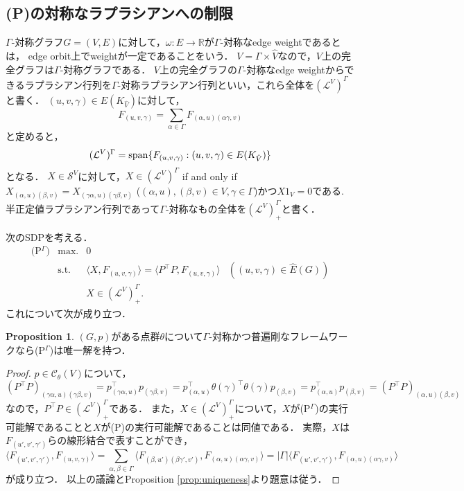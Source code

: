 \documentclass[11pt]{article}
\theoremstyle{definition}
\newtheorem{prop}[defi]{Proposition}
\begin{document}
\subsection{(P)の対称なラプラシアンへの制限}
    $\Gamma$-対称グラフ$G=(V,E)$に対して，$\omega:E \rightarrow \mathbb{R}$が$\Gamma$-対称なedge weightであるとは，
    edge orbit上でweightが一定であることをいう．
    $V=\Gamma \times \hat{V}$なので，$V$上の完全グラフは$\Gamma$-対称グラフである．
    $V$上の完全グラフの$\Gamma$-対称なedge weightからできるラプラシアン行列を$\Gamma$-対称ラプラシアン行列といい，これら全体を$(\mathcal{L}^V)^\Gamma$と書く．
    $(u,v,\gamma) \in E(K_{\hat{V}})$に対して，
    \[
        F_{(u,v,\gamma)} = \sum_{\alpha \in \Gamma} F_{(\alpha,u)(\alpha\gamma,v)}
    \]
    と定めると，
    \[
        (\mathcal{L}^V)^\Gamma = {\rm span} \{ F_{(u,v,\gamma)} : (u,v,\gamma) \in E(K_{\hat{V}})\}
    \]
    となる．
    $X \in \mathcal{S}^V$に対して，$X \in (\mathcal{L}^V)^\Gamma$ if and only if 
    $X_{(\alpha,u)(\beta,v)}=X_{(\gamma\alpha,u)(\gamma\beta,v)}$ ($(\alpha,u), (\beta,v) \in V, \gamma \in \Gamma$)かつ$X1_V=0$である.
    半正定値ラプラシアン行列であって$\Gamma$-対称なもの全体を$(\mathcal{L}^V)^\Gamma_+$と書く．
    
    次のSDPを考える．
    \[
        \begin{array}{llll}
        \text{(P$^\Gamma$)} &  \text{max.}  & 0 \\
                & \text{s.t.}  & \langle X, F_{(u,v,\gamma)} \rangle   =  \langle P^\top P,F_{(u,v,\gamma)} \rangle &((u,v,\gamma) \in \hat{E}(G)) \\
                &              & X \in (\mathcal{L}^V)^\Gamma_+.
        \end{array}
    \]
    これについて次が成り立つ．
    \begin{prop} \label{prop:1}
        $(G,p)$がある点群$\theta$について$\Gamma$-対称かつ普遍剛なフレームワークなら(P$^\Gamma$)は唯一解を持つ．
    \end{prop}
    \begin{proof}
    $p \in \mathcal{C}_\theta(V)$について，
    \begin{equation} \label{eq:c}
        (P^\top P)_{(\gamma\alpha,u)(\gamma\beta,v)} = p_{(\gamma\alpha,u)} ^\top p_{(\gamma\beta,v)} 
        = p_{(\alpha,u)}^\top \theta(\gamma)^\top \theta(\gamma) p_{(\beta,v)} 
        = p_{(\alpha,u)}^\top p_{(\beta,v)} = (P^\top P)_{(\alpha,u)(\beta,v)}
    \end{equation}
    なので，$P^\top P \in (\mathcal{L}^V)^\Gamma_+$である．
    また，$X \in (\mathcal{L}^V)^\Gamma_+$について，$X$が(P$^\Gamma$)の実行可能解であることと$X$が(P)の実行可能解であることは同値である．
    実際，$X$は$F_{(u',v',\gamma')}$らの線形結合で表すことができ，
    \[
        \langle F_{(u',v',\gamma')}, F_{(u,v,\gamma)} \rangle 
        = \sum_{\alpha,\beta \in \Gamma} \langle F_{(\beta,u')(\beta\gamma',v')} , F_{(\alpha,u)(\alpha\gamma,v)} \rangle 
        = |\Gamma| \langle F_{(u',v',\gamma')}, F_{(\alpha,u)(\alpha\gamma,v)} \rangle
    \]
    が成り立つ．
    以上の議論とProposition \ref{prop:uniqueness}より題意は従う．
    \end{proof}
    
\end{document}
